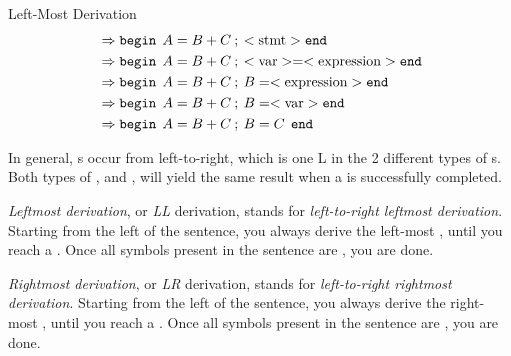 \begin{example}[]{Left-Most Derivation}
\begin{align*}
                          &\Rightarrow \mathtt{begin} \:\: A = B + C\: ; \: <\text{stmt}> \mathtt{end} \\
                          &\Rightarrow \mathtt{begin} \:\: A = B + C\: ; \: <\text{var}> = <\text{expression}> \mathtt{end} \\
                          &\Rightarrow \mathtt{begin} \:\: A = B + C\: ; \: B = <\text{expression}> \mathtt{end} \\
                          &\Rightarrow \mathtt{begin} \:\: A = B + C\: ; \: B = <\text{var}> \mathtt{end} \\
                          &\Rightarrow \mathtt{begin} \:\: A = B + C\: ; \: B = C \:\: \mathtt{end} 
  \end{align*}
\end{example}

In general, s occur from left-to-right, which is one L in the 2 different types of s.
Both types of ,  and , will yield the same result when a  is successfully completed.

\begin{definition}\label{def:Leftmost_Derivation}
  \emph{Leftmost derivation}, or \emph{LL} derivation, stands for \emph{left-to-right leftmost derivation}.
  Starting from the left of the sentence, you always derive the left-most , until you reach a .
  Once all symbols present in the sentence are , you are done.
\end{definition}

\begin{definition}\label{def:Rightmost_Derivation}
  \emph{Rightmost derivation}, or \emph{LR} derivation, stands for \emph{left-to-right rightmost derivation}.
  Starting from the left of the sentence, you always derive the right-most , until you reach a .
  Once all symbols present in the sentence are , you are done.
\end{definition}

